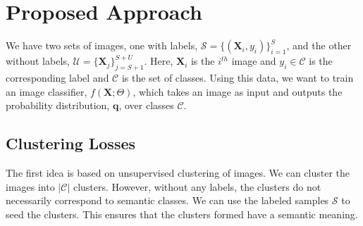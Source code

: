 \section{Proposed Approach}

We have two sets of images, one with labels, $\mathcal{S} = \{(\mathbf{X}_i, y_i)\}_{i=1}^S$, and 
the other without labels, $\mathcal{U} = \{\mathbf{X}_j\}_{j=S+1}^{S+U}$. Here, $\mathbf{X}_i$ is the
$i^{th}$ image and $y_i \in \mathcal{C}$ is the corresponding label and $\mathcal{C}$ is the set of
classes.  Using this data, we want to train an image classifier, $f(\mathbf{X}; \Theta)$,
which takes an image as input and outputs the probability distribution, $\mathbf{q}$, over classes
$\mathcal{C}$.

\subsection{Clustering Losses}

The first idea is based on unsupervised clustering of images. We can cluster the images into
$|\mathcal{C}|$ clusters. However, without any labels, the clusters do not necessarily
correspond to semantic classes. We can use the labeled samples $\mathcal{S}$ to seed the clusters.
This ensures that the clusters formed have a semantic meaning.

